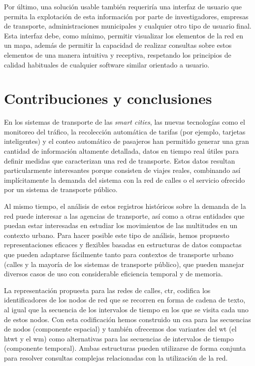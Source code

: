     Por \'ultimo, una soluci\'on usable tambi\'en requerir\'ia una interfaz de usuario que permita la explotaci\'on de esta informaci\'on por parte de investigadores, empresas de transporte, administraciones municipales y cualquier otro tipo de usuario final. Esta interfaz debe, como m\'inimo, permitir visualizar los elementos de la red en un mapa, adem\'as de permitir la capacidad de realizar consultas sobre estos elementos de una manera intuitiva y receptiva, respetando los principios de calidad habituales de cualquier software similar orientado a usuario.

\section{Contribuciones y conclusiones}
\label{sec:appendix-spanishsummary:conclusiones}

    En los sistemas de transporte de las \textit{smart cities}, las nuevas tecnolog\'ias como el monitoreo del tr\'afico, la recolecci\'on autom\'atica de tarifas (por ejemplo, tarjetas inteligentes) y el conteo autom\'atico de pasajeros han permitido generar una gran cantidad de informaci\'on altamente detallada, datos en tiempo real \'utiles para definir medidas que caracterizan una red de transporte. Estos datos resultan particularmente interesantes porque consisten de viajes reales, combinando as\'i impl\'icitamente la demanda del sistema con la red de calles o el servicio ofrecido por un sistema de transporte p\'ublico.

    Al mismo tiempo, el an\'alisis de estos registros hist\'oricos sobre la demanda de la red puede interesar a las agencias de transporte, as\'i como a otras entidades que puedan estar interesadas en estudiar los movimientos de las multitudes en un contexto urbano. Para hacer posible este tipo de an\'alisis, hemos propuesto representaciones eficaces y flexibles basadas en estructuras de datos compactas que pueden adaptarse f\'acilmente tanto para contextos de transporte urbano (calles y la mayor\'ia de los sistemas de transporte p\'ublico), que pueden manejar diversos casos de uso con considerable eficiencia temporal y de memoria.
    
    La representaci\'on propuesta para las redes de calles, \gls{ctr}, codifica los identificadores de los nodos de red que se recorren en forma de cadena de texto, al igual que la secuencia de los intervalos de tiempo en los que se visita cada uno de estos nodos. Con esta codificaci\'on hemos construido un \gls{csa} para las secuencias de nodos (componente espacial) y tambi\'en ofrecemos dos variantes del \gls{wt} (el \gls{htwt} y el \gls{wm}) como alternativas para las secuencias de intervalos de tiempo (componente temporal). Ambas estructuras pueden utilizarse de forma conjunta para resolver consultas complejas relacionadas con la utilizaci\'on de la red.

